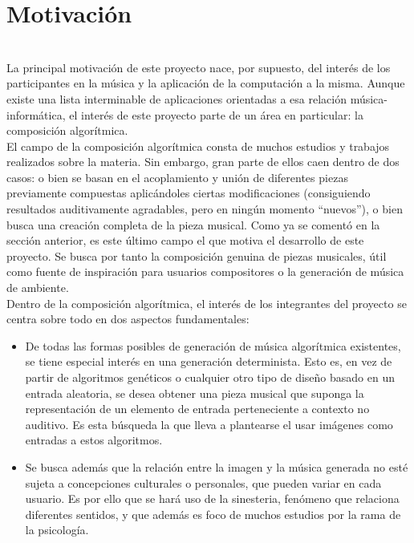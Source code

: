 \section{Motivación}
\label{sec:motivacion}

\\

La principal motivación de este proyecto nace, por supuesto, del interés de los participantes en la música y la aplicación de la computación a la misma. Aunque existe una lista interminable de aplicaciones orientadas a esa relación música-informática, el interés de este proyecto parte de un área en particular: la composición algorítmica.\\

El campo de la composición algorítmica consta de muchos estudios y trabajos realizados sobre la materia. Sin embargo, gran parte de ellos caen dentro de dos casos: o bien se basan en el acoplamiento y unión de diferentes piezas previamente compuestas aplicándoles ciertas modificaciones (consiguiendo resultados auditivamente agradables, pero en ningún momento ``nuevos''), o bien busca una creación completa de la pieza musical. Como ya se comentó en la sección anterior, es este último campo el que motiva el desarrollo de este proyecto. Se busca por tanto la composición genuina de piezas musicales, útil como fuente de inspiración para usuarios compositores o la generación de música de ambiente.\\

Dentro de la composición algorítmica, el interés de los integrantes del proyecto se centra sobre todo en dos aspectos fundamentales:

\begin{itemize}

	\item De todas las formas posibles de generación de música algorítmica existentes, se tiene especial interés en una generación determinista. Esto es, en vez de partir de algoritmos genéticos o cualquier otro tipo de diseño basado en un entrada aleatoria, se desea obtener una pieza musical que suponga la representación de un elemento de entrada perteneciente a contexto no auditivo. Es esta búsqueda la que lleva a plantearse el usar imágenes como entradas a estos algoritmos.
	
	\item  Se busca además que la relación entre la imagen y la música generada no esté sujeta a concepciones culturales o personales, que pueden variar en cada usuario. Es por ello que se hará uso de la sinesteria, fenómeno que relaciona diferentes sentidos, y que además es foco de muchos estudios por la rama de la psicología.
	
\end{itemize}

